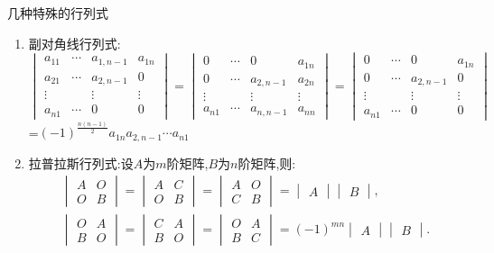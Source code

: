\documentclass[8pt a4paper, oneside, UTF8]{ctexbook}
\begin{document}
\begin{sloppypar}
\begin{criterion}{几种特殊的行列式}{}
\begin{enumerate}
            \item 副对角线行列式:$$\begin{vmatrix}a_{11}&\cdots&a_{1,n-1}&a_{1n}\\a_{21}&\cdots&a_{2,n-1}&0\\\vdots&&\vdots&\vdots\\a_{n1}&\cdots&0&0\end{vmatrix}=\begin{vmatrix}0&\cdots&0&a_{1n}\\0&\cdots&a_{2,n-1}&a_{2n}\\\vdots&&\vdots&\vdots\\a_{n1}&\cdots&a_{n,n-1}&a_{nn}\end{vmatrix}=\begin{vmatrix}0&\cdots&0&a_{1n}\\0&\cdots&a_{2,n-1}&0\\\vdots&&\vdots&\vdots\\a_{n1}&\cdots&0&0\end{vmatrix} $$=$(-1)^{\frac{n(n-1)}{2}}a_{1n}a_{2,n-1}\cdots a_{n1}$
            \item 拉普拉斯行列式:设$A$为$m$阶矩阵,$B$为$n$阶矩阵,则:$$\begin{gathered}\begin{vmatrix}A&O\\O&B\end{vmatrix}=\begin{vmatrix}A&C\\O&B\end{vmatrix}=\begin{vmatrix}A&O\\C&B\end{vmatrix}=\begin{vmatrix}A\end{vmatrix}\begin{vmatrix}B\end{vmatrix},\\\begin{vmatrix}O&A\\B&O\end{vmatrix}=\begin{vmatrix}C&A\\B&O\end{vmatrix}=\begin{vmatrix}O&A\\B&C\end{vmatrix}=(-1)^{mn}\begin{vmatrix}A\end{vmatrix}\begin{vmatrix}B\end{vmatrix} .\end{gathered}$$

\end{enumerate}
\end{criterion}
\end{sloppypar}
\end{document}
